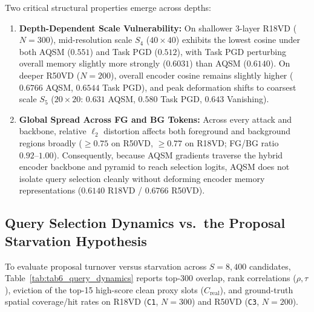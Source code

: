 \documentclass[preprint,10pt]{elsarticle}
\begin{document}
Two critical structural properties emerge across depths:
\begin{enumerate}
    \item \textbf{Depth-Dependent Scale Vulnerability:} On shallower 3-layer R18VD ($N=300$), mid-resolution scale $S_4$ ($40 \times 40$) exhibits the lowest cosine under both AQSM ($0.551$) and Task PGD ($0.512$), with Task PGD perturbing overall memory slightly more strongly ($0.6031$) than AQSM ($0.6140$). On deeper R50VD ($N=200$), overall encoder cosine remains slightly higher ($0.6766$ AQSM, $0.6544$ Task PGD), and peak deformation shifts to coarsest scale $S_5$ ($20 \times 20$: $0.631$ AQSM, $0.580$ Task PGD, $0.643$ Vanishing).
    \item \textbf{Global Spread Across FG and BG Tokens:} Across every attack and backbone, relative $\ell_2$ distortion affects both foreground and background regions broadly ($\ge 0.75$ on R50VD, $\ge 0.77$ on R18VD; FG/BG ratio $0.92\text{--}1.00$). Consequently, because AQSM gradients traverse the hybrid encoder backbone and pyramid to reach selection logits, AQSM does not isolate query selection cleanly without deforming encoder memory representations ($0.6140$ R18VD / $0.6766$ R50VD).
\end{enumerate}

\subsection{Query Selection Dynamics vs.\ the Proposal Starvation Hypothesis}
\label{sec:query_dynamics}
To evaluate proposal turnover versus starvation across $S = 8,400$ candidates, Table~\ref{tab:tab6_query_dynamics} reports top-300 overlap, rank correlations ($\rho, \tau$), eviction of the top-15 high-score clean proxy slots ($C_{\mathrm{real}}$), and ground-truth spatial coverage/hit rates on R18VD (\texttt{C1}, $N = 300$) and R50VD (\texttt{C3}, $N = 200$).
\end{document}
